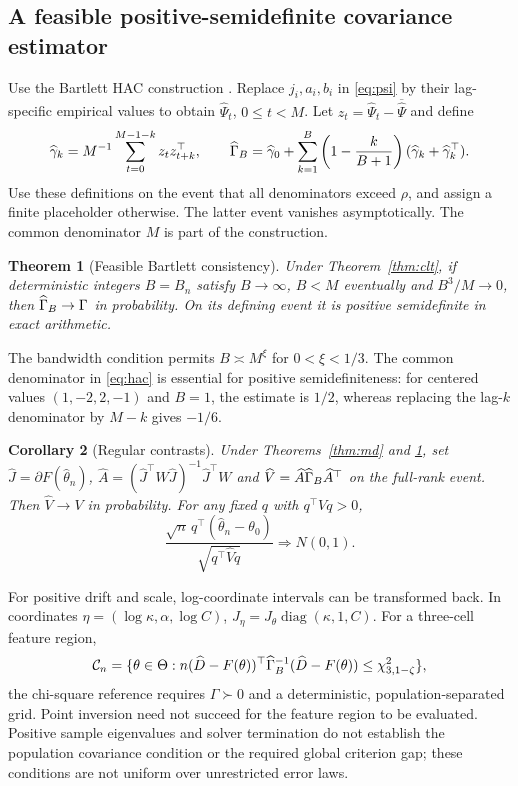 \documentclass[11pt,a4paper]{article}
\newtheorem{theorem}{Theorem}[section]
\newtheorem{corollary}[theorem]{Corollary}
\theoremstyle{remark}\newtheorem{remark}[theorem]{Remark}
\DeclareMathOperator{\diag}{diag}\DeclareMathOperator{\sgn}{sgn}
\begin{document}
\subsection{A feasible positive-semidefinite covariance estimator}
Use the Bartlett HAC construction \cite{nw_hac}. Replace $j_i,a_i,b_i$ in \eqref{eq:psi} by their lag-specific empirical values to obtain $\widehat\Psi_t$, $0\le t<M$. Let $z_t=\widehat\Psi_t-\overline{\widehat\Psi}$ and define
\begin{equation}\label{eq:hac}
\widehat\gamma_k=M^{-1}\sum_{t=0}^{M-1-k}z_tz_{t+k}^\top,\qquad
\widehat\Gamma_B=\widehat\gamma_0+\sum_{k=1}^B\left(1-\frac{k}{B+1}\right)
(\widehat\gamma_k+\widehat\gamma_k^\top).
\end{equation}
Use these definitions on the event that all denominators exceed $\rho$, and assign a finite placeholder otherwise. The latter event vanishes asymptotically. The common denominator $M$ is part of the construction.

\begin{theorem}[Feasible Bartlett consistency]\label{thm:hac}
Under Theorem~\ref{thm:clt}, if deterministic integers $B=B_n$ satisfy
$B\to\infty$, $B<M$ eventually and $B^3/M\to0$, then
$\widehat\Gamma_B\to\Gamma$ in probability. On its defining event it is positive semidefinite in exact arithmetic.
\end{theorem}


The bandwidth condition permits $B\asymp M^\xi$ for $0<\xi<1/3$. The common denominator in \eqref{eq:hac} is essential for positive semidefiniteness: for centered values $(1,-2,2,-1)$ and $B=1$, the estimate is $1/2$, whereas replacing the lag-$k$ denominator by $M-k$ gives $-1/6$.

\begin{corollary}[Regular contrasts]\label{cor:wald}
Under Theorems~\ref{thm:md} and \ref{thm:hac}, set
$\widehat J=\partial F(\widehat\theta_n)$,
$\widehat A=(\widehat J^\top W\widehat J)^{-1}\widehat J^\top W$ and
$\widehat V=\widehat A\widehat\Gamma_B\widehat A^\top$ on the full-rank event. Then $\widehat V\to V$ in probability. For any fixed $q$ with $q^\top Vq>0$,
\[
\frac{\sqrt n\,q^\top(\widehat\theta_n-\theta_0)}{\sqrt{q^\top\widehat Vq}}
\Rightarrow N(0,1).
\]
\end{corollary}


For positive drift and scale, log-coordinate intervals can be transformed back. In coordinates $\eta=(\log\kappa,\alpha,\log C)$, $J_\eta=J_\theta\diag(\kappa,1,C)$.
For a three-cell feature region,
\begin{equation}\label{eq:region}
\mathcal C_n=\{\theta\in\Theta:
n(\widehat D-F(\theta))^\top\widehat\Gamma_B^{-1}(\widehat D-F(\theta))\le\chi^2_{3,1-\zeta}\},
\end{equation}
the chi-square reference requires $\Gamma\succ0$ and a deterministic, population-separated grid. Point inversion need not succeed for the feature region to be evaluated. Positive sample eigenvalues and solver termination do not establish the population covariance condition or the required global criterion gap; these conditions are not uniform over unrestricted error laws.
\end{document}
